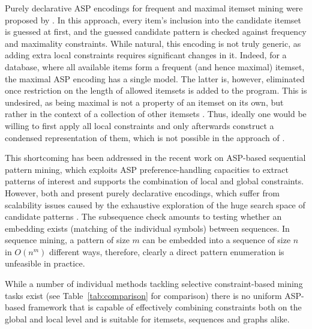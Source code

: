  Purely declarative ASP encodings for frequent and maximal itemset mining were proposed by \textcite{DBLP:conf/lpnmr/Jarvisalo11}. In this approach, every item's inclusion into the candidate itemset is guessed at first, and the guessed candidate pattern is checked against frequency and maximality constraints. While natural, this encoding is not  truly generic, as adding extra local constraints requires significant changes in it. Indeed, for a database, where all available items form a frequent (and hence maximal) itemset, the maximal ASP encoding has a single model. The latter is, however, eliminated once restriction on the length of allowed itemsets is added to the program. This is undesired, as being maximal
is not a  property of an itemset on its own, but rather %
in the context of a collection of other itemsets \parencite{DBLP:journals/kais/BonchiL06}. Thus, ideally one would be willing to first apply all local constraints and only afterwards construct a condensed representation of them, which is not possible in the approach of  \textcite{DBLP:conf/lpnmr/Jarvisalo11}. %

This shortcoming has been addressed in the recent work \parencite{DBLP:conf/ijcai/GebserGQ0S16} on ASP-based sequential pattern mining, which exploits ASP preference-handling capacities to extract patterns of interest and supports the combination of local and global constraints. However, both \textcite{DBLP:conf/ijcai/GebserGQ0S16} and \textcite{DBLP:conf/lpnmr/Jarvisalo11} present %
purely declarative encodings, which suffer from scalability issues caused by the exhaustive exploration of the huge search space of candidate patterns . The subsequence check amounts to testing whether an embedding exists (matching of the individual symbols) between sequences. In sequence mining, a pattern of size $m$ can be embedded into a sequence of size $n$ in $O(n^m)$ different ways, therefore, clearly a direct pattern enumeration is unfeasible in practice. 

While a number of individual methods tackling selective constraint-based mining tasks exist (see Table~\ref{tab:comparison} for comparison) there is no uniform ASP-based framework that is capable of effectively combining constraints both on the global and local level and is suitable for itemsets, sequences and graphs alike.

